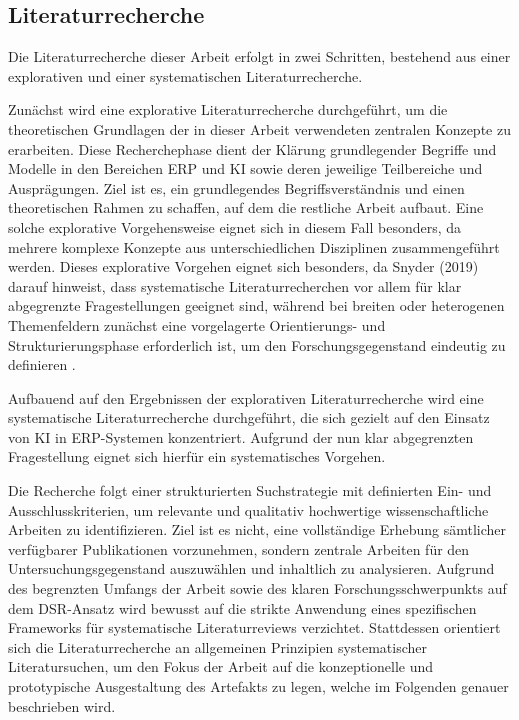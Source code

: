\subsection{Literaturrecherche}
Die Literaturrecherche dieser Arbeit erfolgt in zwei Schritten, bestehend aus einer explorativen und einer systematischen Literaturrecherche.

Zunächst wird eine explorative Literaturrecherche durchgeführt, um die theoretischen Grundlagen der in dieser Arbeit verwendeten zentralen Konzepte zu erarbeiten. Diese Recherchephase dient der Klärung grundlegender Begriffe und Modelle in den Bereichen \ac{ERP} und \ac{KI} sowie deren jeweilige Teilbereiche und Ausprägungen. Ziel ist es, ein grundlegendes Begriffsverständnis und einen theoretischen Rahmen zu schaffen, auf dem die restliche Arbeit aufbaut. Eine solche explorative Vorgehensweise eignet sich in diesem Fall besonders, da mehrere komplexe Konzepte aus unterschiedlichen Disziplinen zusammengeführt werden. Dieses explorative Vorgehen eignet sich besonders, da Snyder (2019) darauf hinweist, dass systematische Literaturrecherchen vor allem für klar abgegrenzte Fragestellungen geeignet sind, während bei breiten oder heterogenen Themenfeldern zunächst eine vorgelagerte Orientierungs- und Strukturierungsphase erforderlich ist, um den Forschungsgegenstand eindeutig zu definieren \cite[\pagef 334ff]{snyder_literature_2019}.

Aufbauend auf den Ergebnissen der explorativen Literaturrecherche wird eine systematische Literaturrecherche durchgeführt, die sich gezielt auf den Einsatz von \ac{KI} in \ac{ERP}-Systemen konzentriert. Aufgrund der nun klar abgegrenzten Fragestellung eignet sich hierfür ein systematisches Vorgehen.

Die Recherche folgt einer strukturierten Suchstrategie mit definierten Ein- und Ausschlusskriterien, um relevante und qualitativ hochwertige wissenschaftliche Arbeiten zu identifizieren. Ziel ist es nicht, eine vollständige Erhebung sämtlicher verfügbarer Publikationen vorzunehmen, sondern zentrale Arbeiten für den Untersuchungsgegenstand auszuwählen und inhaltlich zu analysieren. Aufgrund des begrenzten Umfangs der Arbeit sowie des klaren Forschungsschwerpunkts auf dem \ac{DSR}-Ansatz wird bewusst auf die strikte Anwendung eines spezifischen Frameworks für systematische Literaturreviews verzichtet. Stattdessen orientiert sich die Literaturrecherche an allgemeinen Prinzipien systematischer Literatursuchen, um den Fokus der Arbeit auf die konzeptionelle und prototypische Ausgestaltung des Artefakts zu legen, welche im Folgenden genauer beschrieben wird.
